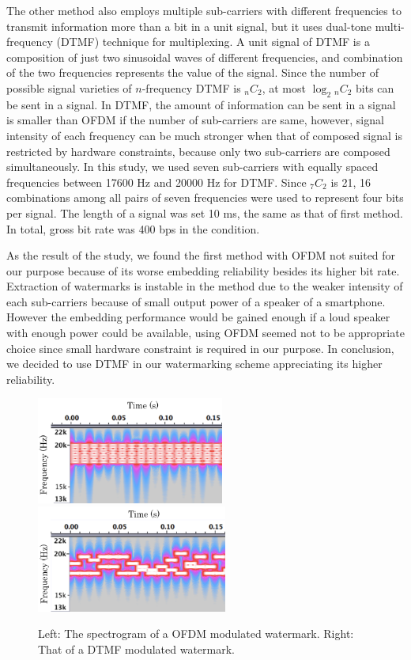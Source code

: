 The other method also employs multiple sub-carriers with different frequencies to transmit information more than a bit in a unit signal, but it uses dual-tone multi-frequency (DTMF) technique for multiplexing.
A unit signal of DTMF is a composition of just two sinusoidal waves of different frequencies, and combination of the two frequencies represents the value of the signal.
Since the number of possible signal varieties of $n$-frequency DTMF is $_n C _2$, at most $\log_2 {}_n C _2$ bits can be sent in a signal.
In DTMF, the amount of information can be sent in a signal is smaller than OFDM if the number of sub-carriers are same, however, signal intensity of each frequency can be much stronger when that of composed signal is restricted by hardware constraints, because only two sub-carriers are composed simultaneously.
In this study, we used seven sub-carriers with equally spaced frequencies between 17600 Hz and 20000 Hz for DTMF. Since $_7 C _2$ is 21, 16 combinations among all pairs of seven frequencies were used to represent four bits per signal.
The length of a signal was set 10 ms, the same as that of first method.
In total, gross bit rate was 400 bps in the condition.

As the result of the study, we found the first method with OFDM not suited for our purpose because of its worse embedding reliability besides its higher bit rate.
Extraction of watermarks is instable in the method due to the weaker intensity of each sub-carriers because of small output power of a speaker of a smartphone.
However the embedding performance would be gained enough if a loud speaker with enough power could be available, using OFDM seemed not to be appropriate choice since small hardware constraint is required in our purpose.
In conclusion, we decided to use DTMF in our watermarking scheme appreciating its higher reliability.

\begin{figure}[htbp]
 \begin{center}
  \includegraphics[height=35mm]{watermarking_ofdm.png}
  \hspace{5mm}
  \includegraphics[height=35mm]{watermarking_dtmf.png}
 \end{center}
 \caption{Left: The spectrogram of a OFDM modulated watermark. Right: That of a DTMF modulated watermark.}
 \label{fig:watr_spec}
\end{figure}

